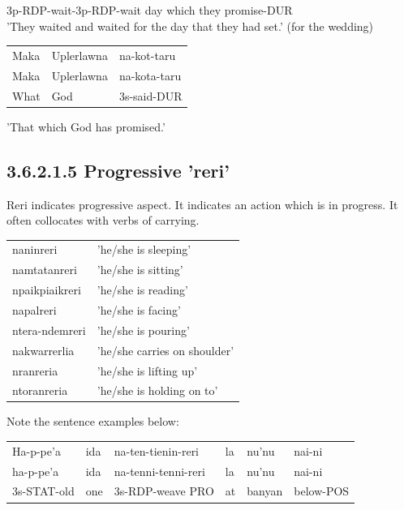 \documentclass[10pt]{article}
\begin{document}
3p-RDP-wait-3p-RDP-wait day which they promise-DUR\\
'They waited and waited for the day that they had set.' (for the wedding)

\begin{center}
\begin{tabular}{lll}
Maka & Uplerlawna & na-kot-taru \\
Maka & Uplerlawna & na-kota-taru \\
What & God & 3s-said-DUR \\
\end{tabular}
\end{center}

'That which God has promised.'

\subsection*{3.6.2.1.5 Progressive 'reri'}
Reri indicates progressive aspect. It indicates an action which is in progress. It often collocates with verbs of carrying.

\begin{center}
\begin{tabular}{ll}
naninreri & 'he/she is sleeping' \\
namtatanreri & 'he/she is sitting' \\
npaikpiaikreri & 'he/she is reading' \\
napalreri & 'he/she is facing' \\
ntera-ndemreri & 'he/she is pouring' \\
nakwarrerlia & 'he/she carries on shoulder' \\
nranreria & 'he/she is lifting up' \\
ntoranreria & 'he/she is holding on to' \\
\end{tabular}
\end{center}

Note the sentence examples below:

\begin{center}
\begin{tabular}{llllll}
Ha-p-pe'a & ida & na-ten-tienin-reri & la & nu'nu & nai-ni \\
ha-p-pe'a & ida & na-tenni-tenni-reri & la & nu'nu & nai-ni \\
3s-STAT-old & one & 3s-RDP-weave PRO & at & banyan & below-POS \\
\end{tabular}
\end{center}
\end{document}
